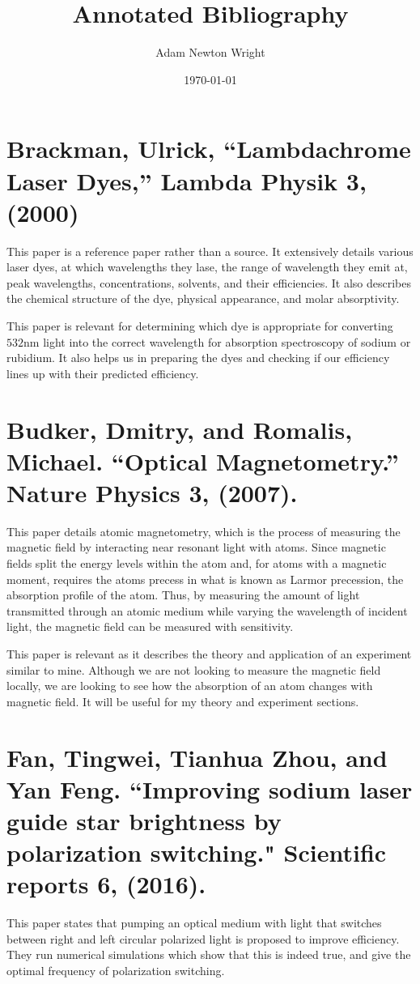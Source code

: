 \documentclass{article}
\title{Annotated Bibliography}
\author{Adam Newton Wright}
\date{\today}
\begin{document}
\maketitle

\section*{Brackman, Ulrick, ``Lambdachrome Laser Dyes,” Lambda Physik 3, (2000)}
This paper is a reference paper rather than a source. It extensively details various laser dyes, at which wavelengths they lase, the range of wavelength they emit at, peak wavelengths, concentrations, solvents, and their efficiencies. It also describes the chemical structure of the dye, physical appearance, and molar absorptivity.

This paper is relevant for determining which dye is appropriate for converting $532 \si{\nano \meter}$ light into the correct wavelength for absorption spectroscopy of sodium or rubidium. It also helps us in preparing the dyes and checking if our efficiency lines up with their predicted efficiency.

\section*{Budker, Dmitry, and Romalis, Michael. ``Optical Magnetometry.” Nature Physics 3, (2007).}
This paper details atomic magnetometry, which is the process of measuring the magnetic field by interacting near resonant light with atoms. Since magnetic fields split the energy levels within the atom and, for atoms with a magnetic moment, requires the atoms precess in what is known as Larmor precession, the absorption profile of the atom. Thus, by measuring the amount of light transmitted through an atomic medium while varying the wavelength of incident light, the magnetic field can be measured with sensitivity. 

This paper is relevant as it describes the theory and application of an experiment similar to mine. Although we are not looking to measure the magnetic field locally, we are looking to see how the absorption of an atom changes with magnetic field. It will be useful for my theory and experiment sections.
%


\section*{Fan, Tingwei, Tianhua Zhou, and Yan Feng. ``Improving sodium laser guide star brightness by polarization switching." Scientific reports 6, (2016).}
This paper states that pumping an optical medium with light that switches between right and left circular polarized light is proposed to improve efficiency. They run numerical simulations which show that this is indeed true, and give the optimal frequency of polarization switching.
\end{document}
